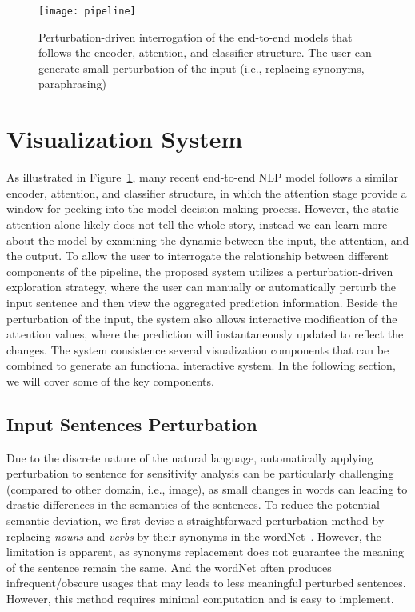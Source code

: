 
\begin{figure}[htbp]
\centering
\vspace{-2mm}
 \texttt{[image: pipeline]}
 \caption{
 Perturbation-driven interrogation of the end-to-end models that follows the encoder, attention, and classifier structure. The user can generate small perturbation of the input (i.e., replacing synonyms, paraphrasing)
 }
\label{fig:modelPipeline}
\end{figure}

\section{Visualization System}
As illustrated in Figure~\ref{fig:modelPipeline}, many recent end-to-end NLP model follows a similar encoder, attention, and classifier structure, in which the attention stage provide a window for peeking into the model decision making process. However, the static attention alone likely does not tell the whole story, instead we can learn more about the model by examining the dynamic between the input, the attention, and the output. To allow the user to interrogate the relationship between different components of the pipeline, the proposed system utilizes a perturbation-driven exploration strategy, where the user can manually or automatically perturb the input sentence and then view the aggregated prediction information. Beside the perturbation of the input, the system also allows interactive modification of the attention values, where the prediction will instantaneously updated to reflect the changes. 
%
The system consistence several visualization components that can be combined to generate an functional interactive system. In the following section, we will cover some of the key components.

\subsection{Input Sentences Perturbation}
\label{sec:perturb}
Due to the discrete nature of the natural language, automatically applying perturbation to sentence for sensitivity analysis can be particularly challenging (compared to other domain, i.e., image), as small changes in words can leading to drastic differences in the semantics of the sentences.
To reduce the potential semantic deviation, we first devise a straightforward perturbation method by replacing \emph{nouns} and \emph{verbs} by their synonyms in the wordNet~\cite{Miller1995}. However, the limitation is apparent, as synonyms replacement does not guarantee the meaning of the sentence remain the same. And the wordNet often produces infrequent/obscure usages that may leads to less meaningful perturbed sentences. However, this method requires minimal computation and is easy to implement. 

